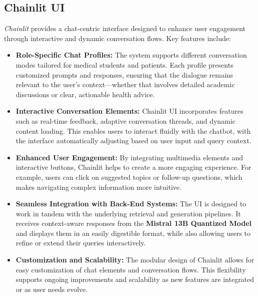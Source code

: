 \subsection{Chainlit UI}
\label{subsec:chainlit_ui}
\emph{Chainlit} provides a chat-centric interface designed to enhance user engagement through interactive and dynamic conversation flows. Key features include:
\begin{itemize}
    \item \textbf{Role-Specific Chat Profiles:} The system supports different conversation modes tailored for medical students and patients. Each profile presents customized prompts and responses, ensuring that the dialogue remains relevant to the user's context—whether that involves detailed academic discussions or clear, actionable health advice.
    \item \textbf{Interactive Conversation Elements:} Chainlit UI incorporates features such as real-time feedback, adaptive conversation threads, and dynamic content loading. This enables users to interact fluidly with the chatbot, with the interface automatically adjusting based on user input and query context.
    \item \textbf{Enhanced User Engagement:} By integrating multimedia elements and interactive buttons, Chainlit helps to create a more engaging experience. For example, users can click on suggested topics or follow-up questions, which makes navigating complex information more intuitive.
    \item \textbf{Seamless Integration with Back-End Systems:} The UI is designed to work in tandem with the underlying retrieval and generation pipelines. It receives context-aware responses from the \textbf{Mistral 13B Quantized Model} and displays them in an easily digestible format, while also allowing users to refine or extend their queries interactively.
    \item \textbf{Customization and Scalability:} The modular design of Chainlit allows for easy customization of chat elements and conversation flows. This flexibility supports ongoing improvements and scalability as new features are integrated or as user needs evolve.
\end{itemize}


